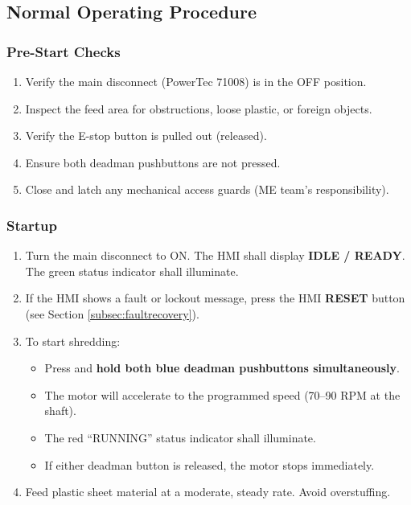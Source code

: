 \documentclass[hidelinks,12pt]{article}
\begin{document}
\subsection{Normal Operating Procedure}

\subsubsection{Pre-Start Checks}
\begin{enumerate}
    \item Verify the main disconnect (PowerTec 71008) is in the OFF position.
    \item Inspect the feed area for obstructions, loose plastic, or foreign objects.
    \item Verify the E-stop button is pulled out (released).
    \item Ensure both deadman pushbuttons are not pressed.
    \item Close and latch any mechanical access guards (ME team's responsibility).
\end{enumerate}

\subsubsection{Startup}
\begin{enumerate}
    \item Turn the main disconnect to ON. The HMI shall display \textbf{IDLE / READY}. The green status indicator shall illuminate.
    \item If the HMI shows a fault or lockout message, press the HMI \textbf{RESET} button (see Section \ref{subsec:faultrecovery}).
    \item To start shredding: 
        \begin{itemize}
            \item Press and \textbf{hold both blue deadman pushbuttons simultaneously}.
            \item The motor will accelerate to the programmed speed (70–90 RPM at the shaft).
            \item The red ``RUNNING'' status indicator shall illuminate.
            \item If either deadman button is released, the motor stops immediately.
        \end{itemize}
    \item Feed plastic sheet material at a moderate, steady rate. Avoid overstuffing.
\end{enumerate}
\end{document}
